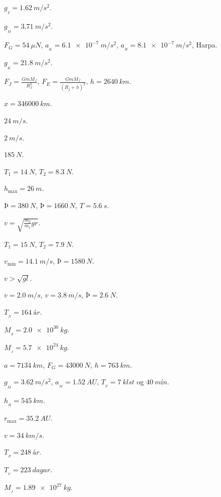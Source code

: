 \begin{enumerate*}[label = \vspace{0.15cm} \textbf{(\arabic*)}]
  \item $g_{_T} = \SI{1.62}{m/s^2}$.
  \item $g_{_M} = \SI{3.71}{m/s^2}$.
  \item $F_G = \SI{54}{\mu N}$, $a_{_K} = \SI{6.1e-7}{m/s^2}$, $a_{_H} = \SI{8.1e-7}{m/s^2}$, Harpa.
  \item $g_{_K} = \SI{21.8}{m/s^2}$.
  \item $F_J = \frac{GmM_J}{R_J^2}$, $F_E = \frac{Gm M_J}{(R_j + h)^2}$,  $h = \SI{2640}{km}$.
  \item $x = \SI{346000}{km}$.
  \item $\SI{24}{m/s}$.
  \item $\SI{2}{m/s}$.
  \item $\SI{185}{N}$.
  \item $T_1 = \SI{14}{N}$, $T_2 = \SI{8.3}{N}$.
  \item $h_{\text{max}} = \SI{26}{m}$.
  \item $Þ = \SI{380}{N}$, $Þ = \SI{1660}{N}$, $T= \SI{5.6}{s}$.
  \item $v = \sqrt{\frac{m_2}{m_1}gr}$.
  \item $T_1 = \SI{15}{N}$, $T_2 = \SI{7.9}{N}$.
  \item $v_{\text{min}} = \SI{14.1}{m/s}$, $Þ = \SI{1580}{N}$.
  \item $v > \sqrt{gl}$.
  \item $v = \SI{2.0}{m/s}$, $v = \SI{3.8}{m/s}$, $Þ = \SI{2.6}{N}$.
  \item $T_{_N} = \SI{164}{ár}$.
  \item $M_{_S} = \SI{2.0e30}{kg}$.
  \item $M_{_J} = \SI{5.7e24}{kg}$.
  \item $a = \SI{7134}{km}$, $F_G = \SI{43000}{N}$, $h = \SI{763}{km}$.
  \item $g_{_M} = \SI{3.62}{m/s^2}$, $a_{_M} = \SI{1.52}{AU}$, $T_{_F} = \SI{7}{klst}$ og $\SI{40}{mín}$.
  \item $h_{_H} = \SI{545}{km}$.
  \item $r_{\text{max}} = \SI{35.2}{AU}$.
  \item $v = \SI{34}{km/s}$.
  \item $T_{_P} = \SI{248}{ár}$.
  \item $T_{_V} = \SI{223}{dagar}$.
  \item $M_{_J} = \SI{1.89e27}{kg}$.
\end{enumerate*}

\newpage